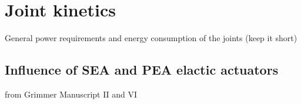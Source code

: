 
\section{Joint kinetics} %
\label{sec:joint_kinetics}
General power requirements and energy consumption of the joints (keep it short)

\subsection{Influence of SEA and PEA elactic actuators} %
\label{sub:influence_of_sea_and_pea_elactic_actuators}
 from Grimmer Manuscript II and VI



